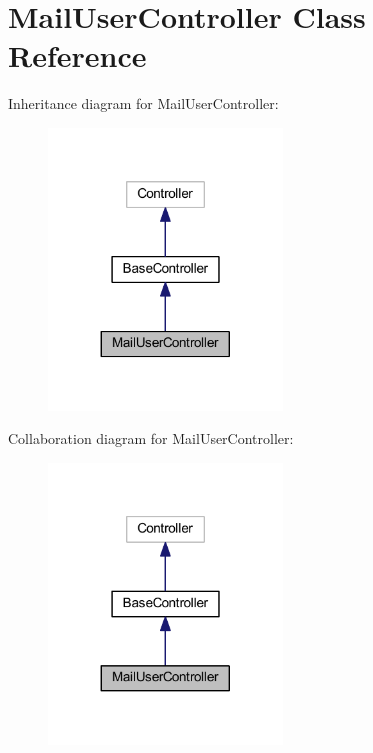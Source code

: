 \hypertarget{class_mail_user_controller}{}\section{Mail\+User\+Controller Class Reference}
\label{class_mail_user_controller}


Inheritance diagram for Mail\+User\+Controller\+:
\nopagebreak
\begin{figure}[H]
\begin{center}
\leavevmode
\includegraphics[width=176pt]{class_mail_user_controller__inherit__graph}
\end{center}
\end{figure}


Collaboration diagram for Mail\+User\+Controller\+:
\nopagebreak
\begin{figure}[H]
\begin{center}
\leavevmode
\includegraphics[width=176pt]{class_mail_user_controller__coll__graph}
\end{center}
\end{figure}
